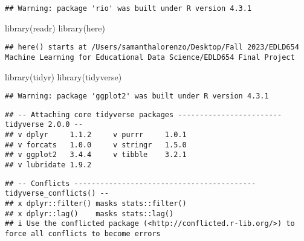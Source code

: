 \documentclass[
]{article}
\newenvironment{Shaded}{\begin{snugshade}}{\end{snugshade}}
\newcommand{\AttributeTok}[1]{\textcolor[rgb]{0.77,0.63,0.00}{#1}}
\newcommand{\ConstantTok}[1]{\textcolor[rgb]{0.00,0.00,0.00}{#1}}
\newcommand{\FunctionTok}[1]{\textcolor[rgb]{0.00,0.00,0.00}{#1}}
\newcommand{\NormalTok}[1]{#1}
\newcommand{\SpecialCharTok}[1]{\textcolor[rgb]{0.00,0.00,0.00}{#1}}
\begin{document}
\begin{Shaded}
\end{Shaded}

\begin{verbatim}
## Warning: package 'rio' was built under R version 4.3.1
\end{verbatim}

\begin{Shaded}
\begin{Highlighting}[]
\FunctionTok{library}\NormalTok{(readr)}
\FunctionTok{library}\NormalTok{(here)}
\end{Highlighting}
\end{Shaded}

\begin{verbatim}
## here() starts at /Users/samanthalorenzo/Desktop/Fall 2023/EDLD654 Machine Learning for Educational Data Science/EDLD654 Final Project
\end{verbatim}

\begin{Shaded}
\begin{Highlighting}[]
\FunctionTok{library}\NormalTok{(tidyr)}
\FunctionTok{library}\NormalTok{(tidyverse)}
\end{Highlighting}
\end{Shaded}

\begin{verbatim}
## Warning: package 'ggplot2' was built under R version 4.3.1
\end{verbatim}

\begin{verbatim}
## -- Attaching core tidyverse packages ------------------------ tidyverse 2.0.0 --
## v dplyr     1.1.2     v purrr     1.0.1
## v forcats   1.0.0     v stringr   1.5.0
## v ggplot2   3.4.4     v tibble    3.2.1
## v lubridate 1.9.2
\end{verbatim}

\begin{verbatim}
## -- Conflicts ------------------------------------------ tidyverse_conflicts() --
## x dplyr::filter() masks stats::filter()
## x dplyr::lag()    masks stats::lag()
## i Use the conflicted package (<http://conflicted.r-lib.org/>) to force all conflicts to become errors
\end{verbatim}
\end{document}
